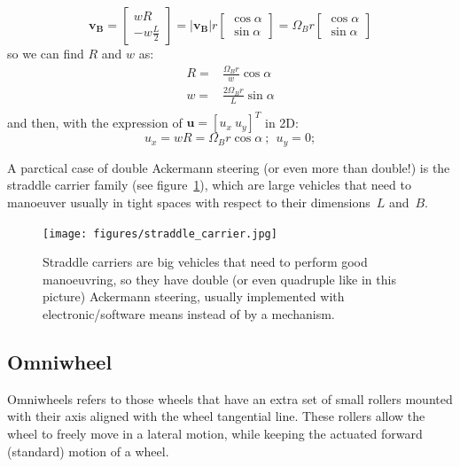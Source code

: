 \begin{equation}
\mathbf{v_B} = 
\left[
 \begin{array}{c}
  wR  \\
  -w\frac{L}{2} 
 \end{array}
\right]
=
|\mathbf{v_B}|r
\left[
 \begin{array}{c}
  \cos \alpha  \\
  \sin \alpha
 \end{array}
\right]
=
\Omega_Br
\left[
 \begin{array}{c}
  \cos \alpha  \\
  \sin \alpha
 \end{array}
\right]
\end{equation}
so we can find $R$ and $w$ as: 
\begin{align}
 R = & \frac{\Omega_B r}{w}\cos \alpha \\
 w = & \frac{2\Omega_B r}{L}\sin \alpha \\
\end{align}
and then, with the expression of $\mathbf{u}=\left[u_x\ u_y \right]^T$ in 2D: 
\begin{equation}
 u_x = wR = \Omega_Br \cos \alpha \ ; \ \ u_y = 0; 
\end{equation}

A parctical case of double Ackermann steering (or even more than double!) is the straddle carrier family (see figure~\ref{fig:straddle_carrier}), which are large vehicles that need to manoeuver usually in tight spaces with respect to their dimensions~$L$ and~$B$. 
\begin{figure}[bth!]
  \begin{center}
    \texttt{[image: figures/straddle\_carrier.jpg]}
    \caption{Straddle carriers are big vehicles that need to perform good manoeuvring, so they have double (or even quadruple like in this picture) Ackermann steering, usually implemented with electronic/software means instead of by a mechanism.}
    \label{fig:straddle_carrier}
  \end{center}
\end{figure}


\subsection{Omniwheel}
Omniwheels refers to those wheels that have an extra set of small rollers mounted with their axis aligned with the wheel tangential line. These rollers allow the wheel to freely move in a lateral motion, while keeping the actuated forward (standard) motion of a wheel. 

